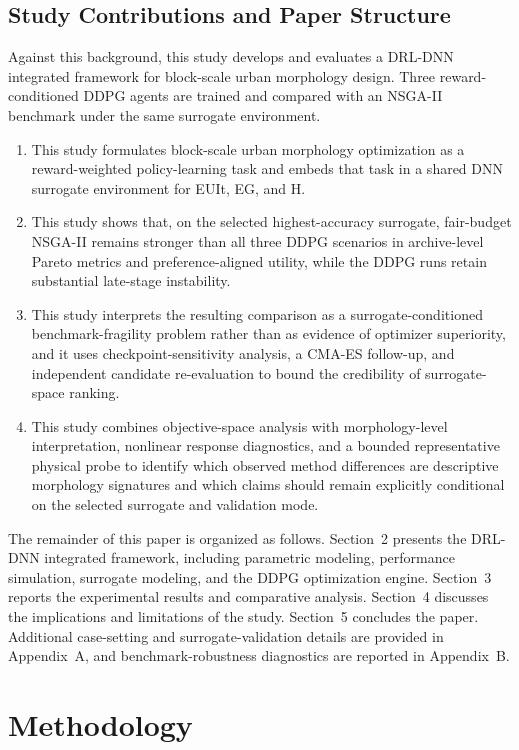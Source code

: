 \documentclass[final,3p,times]{elsarticle}
\begin{document}
\subsection{Study Contributions and Paper Structure}

Against this background, this study develops and evaluates a DRL-DNN integrated framework for block-scale urban morphology design. Three reward-conditioned DDPG agents are trained and compared with an NSGA-II benchmark under the same surrogate environment.

\begin{enumerate}
\item This study formulates block-scale urban morphology optimization as a reward-weighted policy-learning task and embeds that task in a shared DNN surrogate environment for EUIt, EG, and H.
\item This study shows that, on the selected highest-accuracy surrogate, fair-budget NSGA-II remains stronger than all three DDPG scenarios in archive-level Pareto metrics and preference-aligned utility, while the DDPG runs retain substantial late-stage instability.
\item This study interprets the resulting comparison as a surrogate-conditioned benchmark-fragility problem rather than as evidence of optimizer superiority, and it uses checkpoint-sensitivity analysis, a CMA-ES follow-up, and independent candidate re-evaluation to bound the credibility of surrogate-space ranking.
\item This study combines objective-space analysis with morphology-level interpretation, nonlinear response diagnostics, and a bounded representative physical probe to identify which observed method differences are descriptive morphology signatures and which claims should remain explicitly conditional on the selected surrogate and validation mode.
\end{enumerate}

The remainder of this paper is organized as follows. Section~2 presents the DRL-DNN integrated framework, including parametric modeling, performance simulation, surrogate modeling, and the DDPG optimization engine. Section~3 reports the experimental results and comparative analysis. Section~4 discusses the implications and limitations of the study. Section~5 concludes the paper. Additional case-setting and surrogate-validation details are provided in Appendix~A, and benchmark-robustness diagnostics are reported in Appendix~B.

\section{Methodology}
\end{document}
